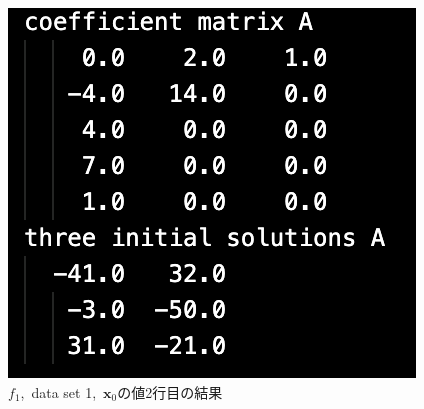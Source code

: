 \documentclass[12pt]{jarticle}
\begin{document}
\begin{figure}[h]
\begin{minipage}{0.3\hsize}
\begin{center}
        \end{center}
    \end{minipage}
    \begin{minipage}{0.3\hsize}
        \begin{center}
            \includegraphics[scale=0.4]{kadai1_2data3.png}
        \end{center}
    \end{minipage}
    \caption{$f_1$,\ data set 1,\ $\boldsymbol{x}_0$の値2行目の結果}
\end{figure}
\end{document}
